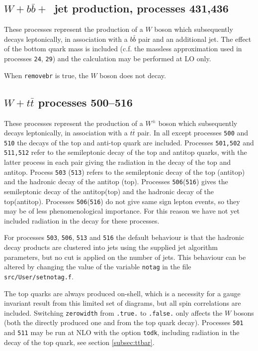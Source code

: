 \documentclass{article}
\begin{document}
{{{{{{\subsection{$W+b{\bar b}+$~jet production, processes 431,436}
\label{subsec:wbbjetmassive}

These processes represent the production of a $W$ boson which subsequently
decays leptonically, in association with a $b{\bar b}$ pair and an
additional jet. The effect of the bottom quark mass is included (c.f. the massless approximation
used in processes {\tt 24}, {\tt 29})
and the calculation may be performed at LO only.

When {\tt removebr} is true, the $W$ boson does not decay.

\subsection{$W+t{\bar t}$ processes 500--516}
\label{subsec:wttdecay}

These processes represent the production of a $W^\pm$ boson which subsequently
decays leptonically, in association with a $t{\bar t}$ pair. In all except processes 
{\tt 500} and {\tt 510} the decays of the top and anti-top quark are included.
Processes {\tt 501,502} and {\tt 511,512} refer to the semileptonic decay of the top and antitop quarks,
with the latter process in each pair giving the radiation in the decay of the top and antitop.
Process {\tt 503} ({\tt 513}) refers to the semileptonic decay of the top (antitop)
and the hadronic decay of the antitop (top). Processes {\tt 506}({\tt 516}) gives the semileptonic
decay of the antitop(top) and the hadronic decay of the top(antitop).  Processes {\tt 506}({\tt 516}) 
do not give same sign lepton events, so they may be of less phenomenological importance. For this reason 
we have not yet included radiation in the decay for these processes. 

For processes {\tt 503}, {\tt 506}, {\tt 513}
and {\tt 516} the default behaviour is that the hadronic decay products
are clustered into jets using the supplied jet
algorithm parameters, but no cut is applied on the number of jets.
This behaviour can be altered by changing the value of the
variable {\tt notag} in the file {\tt src/User/setnotag.f}.

The top quarks are always
produced on-shell, which is a necessity for a gauge invariant result
from this limited set of diagrams, but all spin correlations are included.
Switching {\tt zerowidth} from {\tt .true.} to {\tt .false.} only affects
the $W$ bosons (both the directly produced one and from the top quark decay).
Processes {\tt 501} and {\tt 511} may be run at NLO with the option {\tt todk},
including radiation in the decay of the top quark, see section \ref{subsec:ttbar}.






}}}}}}
\end{document}
